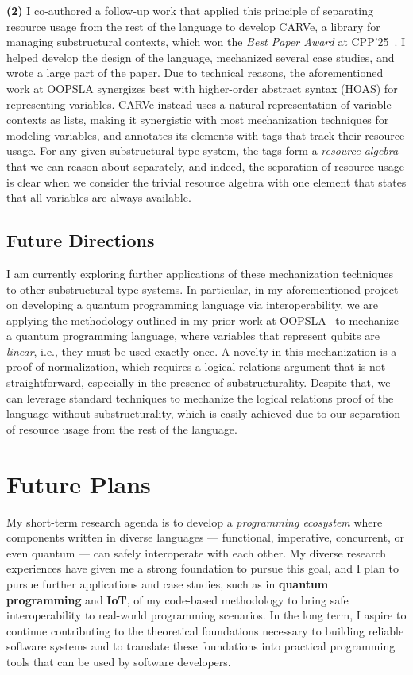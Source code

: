 \documentclass[11pt]{article}
\begin{document}
\textbf{(2)} I co-authored a follow-up work that applied this principle of separating resource usage from the rest of the language to develop CARVe, a library for managing substructural contexts, which won the \emph{Best Paper Award} at CPP'25~\cite{Zackon25cpp}.
I helped develop the design of the language, mechanized several case studies, and wrote a large part of the paper.
Due to technical reasons, the aforementioned work at OOPSLA synergizes best with higher-order abstract syntax (HOAS) for representing variables.
CARVe instead uses a natural representation of variable contexts as lists, making it synergistic with most mechanization techniques for modeling variables, and annotates its elements with tags that track their resource usage.
For any given substructural type system, the tags form a \emph{resource algebra} that we can reason about separately, and indeed, the separation of resource usage is clear when we consider the trivial resource algebra with one element that states that all variables are always available.

\subsection*{Future Directions}
I am currently exploring further applications of these mechanization techniques to other substructural type systems.
In particular, in my aforementioned project on developing a quantum programming language via interoperability, we are applying the methodology outlined in my prior work at OOPSLA~\cite{Sano23oopsla} to mechanize a quantum programming language, where variables that represent qubits are \emph{linear}, i.e., they must be used exactly once.
A novelty in this mechanization is a proof of normalization, which requires a logical relations argument that is not straightforward, especially in the presence of substructurality.
Despite that, we can leverage standard techniques to mechanize the logical relations proof of the language without substructurality, which is easily achieved due to our separation of resource usage from the rest of the language.

\section*{Future Plans}
My short-term research agenda is to develop a \emph{programming ecosystem} where components written in diverse languages --- functional, imperative, concurrent, or even quantum --- can safely interoperate with each other.
My diverse research experiences have given me a strong foundation to pursue this goal, and I plan to pursue further applications and case studies, such as in \textbf{quantum programming} and \textbf{IoT}, of my code-based methodology to bring safe interoperability to real-world programming scenarios.
In the long term, I aspire to continue contributing to the theoretical foundations necessary to building reliable software systems and to translate these foundations into practical programming tools that can be used by software developers.

\printbibliography
\end{document}
